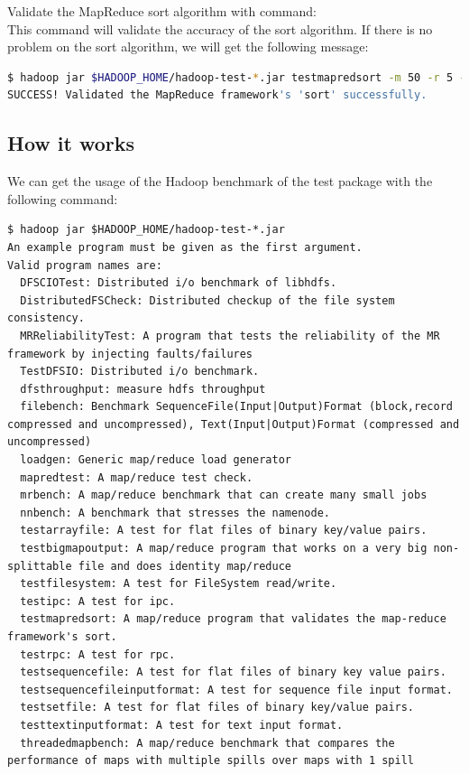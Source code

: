 Validate the MapReduce sort algorithm with command: \\
This command will validate the accuracy of the sort algorithm. If there is no problem on the sort algorithm, we will get the following message:
\lstset{style=bashstyle}
\begin{lstlisting}[language=bash]
$ hadoop jar $HADOOP_HOME/hadoop-test-*.jar testmapredsort -m 50 -r 5 -sortInput random.writer.out -sortOutput random.writer.out.sorted
SUCCESS! Validated the MapReduce framework's 'sort' successfully.
\end{lstlisting}

\subsection*{How it works}
We can get the usage of the Hadoop benchmark of the test package with the following command:
\lstset{style=bashstyle}
\begin{lstlisting}
$ hadoop jar $HADOOP_HOME/hadoop-test-*.jar
An example program must be given as the first argument.
Valid program names are:
  DFSCIOTest: Distributed i/o benchmark of libhdfs.
  DistributedFSCheck: Distributed checkup of the file system consistency.
  MRReliabilityTest: A program that tests the reliability of the MR framework by injecting faults/failures
  TestDFSIO: Distributed i/o benchmark.
  dfsthroughput: measure hdfs throughput
  filebench: Benchmark SequenceFile(Input|Output)Format (block,record compressed and uncompressed), Text(Input|Output)Format (compressed and uncompressed)
  loadgen: Generic map/reduce load generator
  mapredtest: A map/reduce test check.
  mrbench: A map/reduce benchmark that can create many small jobs
  nnbench: A benchmark that stresses the namenode.
  testarrayfile: A test for flat files of binary key/value pairs.
  testbigmapoutput: A map/reduce program that works on a very big non-splittable file and does identity map/reduce
  testfilesystem: A test for FileSystem read/write.
  testipc: A test for ipc.
  testmapredsort: A map/reduce program that validates the map-reduce framework's sort.
  testrpc: A test for rpc.
  testsequencefile: A test for flat files of binary key value pairs.
  testsequencefileinputformat: A test for sequence file input format.
  testsetfile: A test for flat files of binary key/value pairs.
  testtextinputformat: A test for text input format.
  threadedmapbench: A map/reduce benchmark that compares the performance of maps with multiple spills over maps with 1 spill
\end{lstlisting}

